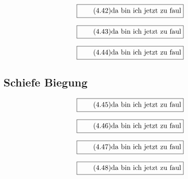 \documentclass[11pt]{article}
\newcommand{\1}{ {\mathds{1}} }
\begin{document}
		\begin{equation}
			\boxed{
				\tag{4.42}
				\begin{split}
					\text{da bin ich jetzt zu faul}
				\end{split}
			}
		\end{equation}

		\begin{equation}
			\boxed{
				\tag{4.43}
				\begin{split}
					\text{da bin ich jetzt zu faul}
				\end{split}
			}
		\end{equation}
		
		\begin{equation}
			\boxed{
				\tag{4.44}
				\begin{split}
					\text{da bin ich jetzt zu faul}
				\end{split}
			}
		\end{equation}

		\subsection{Schiefe Biegung}

		\begin{equation}
			\boxed{
				\tag{4.45}
				\begin{split}
					\text{da bin ich jetzt zu faul}
				\end{split}
			}
		\end{equation}
		
		\begin{equation}
			\boxed{
				\tag{4.46}
				\begin{split}
					\text{da bin ich jetzt zu faul}
				\end{split}
			}
		\end{equation}

		\begin{equation}
			\boxed{
				\tag{4.47}
				\begin{split}
					\text{da bin ich jetzt zu faul}
				\end{split}
			}
		\end{equation}

		\begin{equation}
			\boxed{
				\tag{4.48}
				\begin{split}
					\text{da bin ich jetzt zu faul}
				\end{split}
			}
		\end{equation}
		
\end{document}
